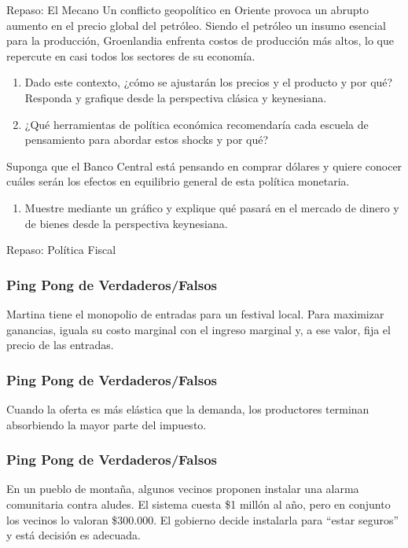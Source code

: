 \documentclass{beamer}
\begin{document}
\begin{frame}{Repaso: El Mecano}
    Un conflicto geopolítico en Oriente provoca un abrupto aumento en el precio global del petróleo. Siendo el petróleo un insumo esencial para la producción, Groenlandia enfrenta costos de producción más altos, lo que repercute en casi todos los sectores de su economía.
    \begin{enumerate}
        \item Dado este contexto, ¿cómo se ajustarán los precios y el producto y por qué? Responda y grafique desde la perspectiva clásica y keynesiana.
        \item ¿Qué herramientas de política económica recomendaría cada escuela de pensamiento para abordar estos shocks y por qué?
        \vspace{3mm}
    \end{enumerate}
    Suponga que el Banco Central está pensando en comprar dólares y quiere conocer cuáles serán los efectos en equilibrio general de esta política monetaria. 
        \begin{enumerate}
        \item  Muestre mediante un gráfico y explique qué pasará en el mercado de dinero y de bienes desde la perspectiva keynesiana.
    \end{enumerate}

\end{frame}

\begin{frame}{Repaso: Política Fiscal}
    
\end{frame}

\begin{frame}
\frametitle{Ping Pong de Verdaderos/Falsos}
\centering
Martina tiene el monopolio de entradas para un festival local. Para maximizar ganancias, iguala su costo marginal con el ingreso marginal y, a ese valor, fija el precio de las entradas.
\end{frame}


\begin{frame}
\frametitle{Ping Pong de Verdaderos/Falsos}
\centering
Cuando la oferta es más elástica que la demanda, los productores terminan absorbiendo la mayor parte del impuesto.
\end{frame}


\begin{frame}
\frametitle{Ping Pong de Verdaderos/Falsos}
\centering
En un pueblo de montaña, algunos vecinos proponen instalar una alarma comunitaria contra aludes. El sistema cuesta \$1 millón al año, pero en conjunto los vecinos lo valoran \$300.000. El gobierno decide instalarla para “estar seguros” y está decisión es adecuada. 
\end{frame}
\end{document}
